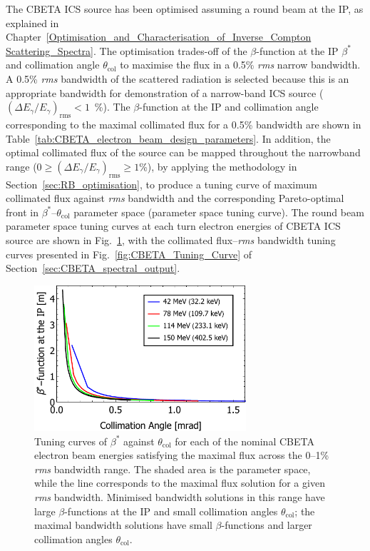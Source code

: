 \documentclass[../main.tex]{subfiles}
\begin{document}
The CBETA ICS source has been optimised assuming a round beam at the IP, as explained in Chapter~\ref{Optimisation_and_Characterisation_of_Inverse_Compton Scattering_Spectra}. The optimisation trades-off of the $\beta$-function at the IP $\beta^{*}$ and collimation angle $\theta_{\mathrm{col}}$ to maximise the flux in a 0.5\% \textit{rms} narrow bandwidth. A 0.5\% \textit{rms} bandwidth of the scattered radiation is selected because this is an appropriate bandwidth for demonstration of a narrow-band ICS source ($\left(\Delta E_{\gamma}/E_{\gamma}\right)_{\mathrm{rms}} < 1$~\%). The $\beta$-function at the IP and collimation angle corresponding to the maximal collimated flux for a 0.5\% bandwidth are shown in Table~\ref{tab:CBETA_electron_beam_design_parameters}. In addition, the optimal collimated flux of the source can be mapped throughout the narrowband range ($0 \geq \left(\Delta E_{\gamma}/E_{\gamma}\right)_{\mathrm{rms}} \geq 1$\%), by applying the methodology in Section~\ref{sec:RB_optimisation}, to produce a tuning curve of maximum collimated flux against \textit{rms} bandwidth and the corresponding Pareto-optimal front in $\beta^{*}$--$\theta_{\mathrm{col}}$ parameter space (parameter space tuning curve). The round beam parameter space tuning curves at each turn electron energies of CBETA ICS source are shown in Fig.~\ref{fig:CBETA_beta_theta_parameter_space}, with the collimated flux--\textit{rms} bandwidth tuning curves presented in Fig.~\ref{fig:CBETA_Tuning_Curve} of Section~\ref{sec:CBETA_spectral_output}.
\begin{figure}[!h]
\centering
\includegraphics[width=0.7\textwidth]{Figures/CBETA_Inverse_Compton_Source_Design/CBETA_COMBINED_beta_theta.pdf}
\caption{Tuning curves of $\beta^{*}$ against $\theta_{\mathrm{col}}$ for each of the nominal CBETA electron beam energies satisfying the maximal flux across the 0--1\% \textit{rms} bandwidth range. The shaded area is the parameter space, while the line corresponds to the maximal flux solution for a given \textit{rms} bandwidth. Minimised bandwidth solutions in this range have large $\beta$-functions at the IP and small collimation angles $\theta_{\mathrm{col}}$; the maximal bandwidth solutions have small $\beta$-functions and larger collimation angles $\theta_{\mathrm{col}}$.}
\label{fig:CBETA_beta_theta_parameter_space}
\end{figure}
\end{document}
